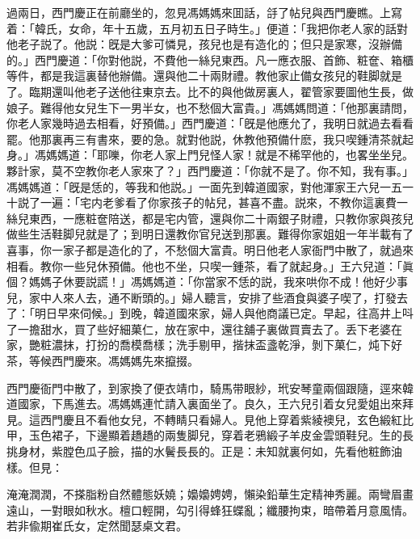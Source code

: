 過兩日，西門慶正在前廳坐的，忽見馮媽媽來囬話，㧱了帖兒與西門慶瞧。上寫着：「韓氏，女命，年十五歲，五月初五日子時生。」便道：「我把你老人家的話對他老子説了。他説：旣是大爹可憐見，孩兒也是有造化的；但只是家寒，沒辦備的。」西門慶道：「你對他説，不費他一絲兒東西。凡一應衣服、首飾、粧奩、箱櫃等件，都是我這裏替他辦備。還與他二十兩財禮。教他家止備女孩兒的鞋脚就是了。臨期還叫他老子送他往東京去。比不的與他做房裏人，翟管家要圖他生長，做娘子。難得他女兒生下一男半女，也不愁個大富貴。」馮媽媽問道：「他那裏請問，你老人家幾時過去相看，好預備。」西門慶道：「旣是他應允了，我明日就過去看看罷。他那裏再三有書來，要的急。就對他説，休教他預備什麽，我只喫鍾清茶就起身。」馮媽媽道：「耶嚛，你老人家上門兒怪人家！就是不稀罕他的，也畧坐坐兒。夥計家，莫不空教你老人家來了？」西門慶道：「你就不是了。你不知，我有事。」馮媽媽道：「旣是恁的，等我和他説。」一面先到韓道國家，對他渾家王六兒一五一十説了一遍：「宅内老爹看了你家孩子的帖兒，甚喜不盡。説來，不教你這裏費一絲兒東西，一應粧奩陪送，都是宅内管，還與你二十兩銀子財禮，只教你家與孩兒做些生活鞋脚兒就是了；到明日還教你官兒送到那裏。難得你家姐姐一年半載有了喜事，你一家子都是造化的了，不愁個大富貴。明日他老人家衙門中散了，就過來相看。教你一些兒休預備。他也不坐，只喫一鍾茶，看了就起身。」王六兒道：「眞個？媽媽子休要説謊！」馮媽媽道：「你當家不恁的説，我來哄你不成！他好少事兒，家中人來人去，通不断頭的。」婦人聽言，安排了些酒食與婆子喫了，打發去了：「明日早來伺候。」到晚，韓道國來家，婦人與他商議已定。早起，往高井上呌了一擔甜水，買了些好細菓仁，放在家中，還往舖子裏做買賣去了。丢下老婆在家，艷粧濃抹，打扮的喬模喬樣；洗手剔甲，揩抹盃盞乾淨，剝下菓仁，炖下好茶，等候西門慶來。馮媽媽先來攛掇。

西門慶衙門中散了，到家換了便衣靖巾，騎馬带眼紗，玳安琴童兩個跟隨，逕來韓道國家，下馬進去。馮媽媽連忙請入裏面坐了。良久，王六兒引着女兒愛姐出來拜見。這西門慶且不看他女兒，不轉睛只看婦人。見他上穿着紫綾襖兒，玄色緞紅比甲，玉色裙子，下邊顯着趫趫的兩隻脚兒，穿着老鴉緞子羊皮金雲頭鞋兒。生的長挑身材，紫膛色瓜子臉，描的水鬢長長的。正是：未知就裏何如，先看他粧飾油樣。但見：

\begin{myquote}
淹淹潤潤，不搽脂粉自然體態妖嬈；嬝嬝娉娉，懶染鉛華生定精神秀麗。兩彎眉畫遠山，一對眼如秋水。檀口輕開，勾引得蜂狂蝶亂；纖腰拘束，暗帶着月意風情。若非偸期崔氏女，定然聞瑟桌文君。
\end{myquote}

